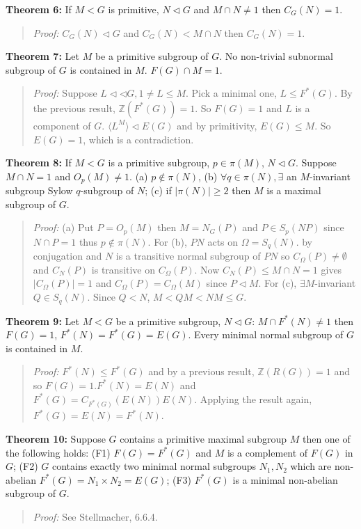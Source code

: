 {\bf Theorem 6:}
If $M<G$ is primitive, $N \lhd G$ and $M \cap N \neq 1$ then $C_G(N) =1$.
\begin{quote}
\emph{Proof:}
$C_G(N) \lhd G$ and $C_G(N) < M \cap N$ then $C_G(N)=1$.
\end{quote}
{\bf Theorem 7:}
Let $M$ be a primitive subgroup of $G$.  No non-trivial subnormal subgroup of $G$ is contained in $M$.
$F(G) \cap M = 1$.
\begin{quote}
\emph{Proof:}
Suppose $L \lhd \lhd G, 1 \neq L \leq M$.  Pick a minimal one, $L \leq F^*(G)$.  By the previous result,
${\mathbb Z}(F^*(G)) = 1$.  So $F(G)=1$ and $L$ is a component of $G$.
$\langle L^M \rangle \lhd E(G)$ and by primitivity, $E(G) \leq M$.  So $E(G)=1$, which is a contradiction.
\end{quote}
{\bf Theorem 8:}
If $M<G$ is a primitive subgroup, $p \in \pi(M)$, $N \lhd G$.  Suppose $M \cap N =1$ and $O_p(M) \neq 1$.
(a) $p \notin \pi(N)$, (b) $\forall q \in \pi(N), \exists$ an $M$-invariant subgroup Sylow $q$-subgroup
of $N$; (c) if $|\pi(N)| \geq 2$ then $M$ is a maximal subgroup of $G$.
\begin{quote}
\emph{Proof:}
(a) Put $P= O_p(M)$ then $M= N_G(P)$ and $P \in S_p(NP)$ since $N \cap P = 1$ thus $p \notin \pi(N)$.
For (b), $PN$ acts on $\Omega= S_q(N)$. by conjugation and $N$ is a transitive normal subgroup of $PN$ so
$C_{\Omega}(P) \neq \emptyset$ and $C_N(P)$ is transitive on $C_{\Omega}(P)$.  Now $C_N(P) \leq M \cap N =1$ gives
$|C_{\Omega}(P)|=1$ and $C_{\Omega}(P)= C_{\Omega}(M)$ since $P \lhd M$.
For (c), $\exists M$-invariant $Q \in S_q(N)$.  Since $Q < N$, $M < QM < NM \leq G$.
\end{quote}
{\bf Theorem 9:}
Let $M<G$ be a primitive subgroup, $N \lhd G$: $M \cap F^*(N) \neq 1$ then
$F(G)=1$, $F^*(N)=F^*(G)= E(G)$. Every minimal normal subgroup of $G$ is contained in $M$.
\begin{quote}
\emph{Proof:}
$F^*(N) \leq F^*(G)$ and by a previous result, ${\mathbb Z}(R(G)) =1$ and so $F(G)=1$.$F^*(N)=E(N)$ and
$F^*(G)= C_{F^*(G)}(E(N))E(N)$.  Applying the result again,
$F^*(G)= E(N)= F^*(N)$.
\end{quote}
{\bf Theorem 10:}
Suppose $G$ contains a primitive maximal subgroup $M$ then one of the following holds:
(F1) $F(G)=F^*(G)$ and $M$ is a complement of $F(G)$ in $G$;
(F2) $G$ contains exactly two minimal normal subgroups $N_1, N_2$ which are non-abelian
$F^*(G)= N_1 \times N_2= E(G)$; (F3) $F^*(G)$ is a minimal non-abelian subgroup of $G$.
\begin{quote}
\emph{Proof:}
See Stellmacher, 6.6.4.
\end{quote}
